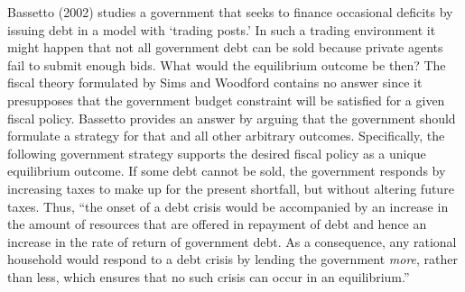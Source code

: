 Bassetto (2002) studies  a government that seeks to
finance occasional deficits by issuing debt in a model with
`trading posts.' In such a trading environment it
might happen that not all government debt can be sold because private
agents fail to submit enough bids. What would  the equilibrium
outcome be then? The fiscal theory formulated by Sims and Woodford contains
no answer since it presupposes that the government budget constraint
will be satisfied for a given  \newpage \noindent fiscal    policy. Bassetto provides
an answer by arguing that the government should formulate a strategy
for that and all other arbitrary outcomes. Specifically, the following
government strategy supports the desired fiscal policy as a unique
equilibrium outcome. If some debt cannot be sold,
the government responds by increasing taxes to make up for the present
shortfall, but without altering future taxes. Thus, ``the onset of a debt crisis
would be accompanied by an increase in the amount of resources that are
offered in repayment of debt and hence an increase in the rate of return
of government debt. As a consequence, any rational household would respond
to a debt crisis by lending the government {\it more}, rather than
less, which ensures that no such crisis can occur in an
equilibrium.''

